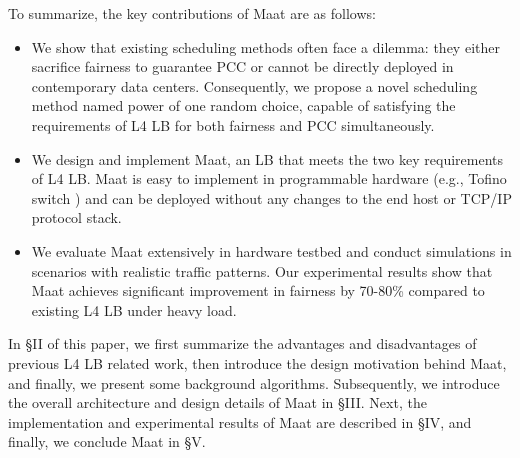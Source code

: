 To summarize, the key contributions of Maat are as follows:
\begin{itemize}
	\item We show that existing scheduling methods often face a dilemma: they either sacrifice fairness to guarantee PCC or cannot be directly deployed in contemporary data centers. Consequently, we propose a novel scheduling method named power of one random choice, capable of satisfying the requirements of L4 LB for both fairness and PCC simultaneously.
	\item We design and implement Maat, an LB that meets the two key requirements of L4 LB. Maat is easy to implement in programmable hardware (e.g., Tofino switch \cite{barefoot2019}) and can be deployed without any changes to the end host or TCP/IP protocol stack.
	\item We evaluate Maat extensively in hardware testbed and conduct simulations in scenarios with realistic traffic patterns. Our experimental results show that Maat achieves significant improvement in fairness by 70-80\% compared to existing L4 LB under heavy load.
\end{itemize}

In \S II of this paper, we first summarize the advantages and disadvantages of previous L4 LB related work, then introduce the design motivation behind Maat, and finally, we present some background algorithms. Subsequently, we introduce the overall architecture and design details of Maat in \S III. Next, the implementation and experimental results of Maat are described in \S IV, and finally, we conclude Maat in \S V.